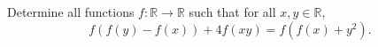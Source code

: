 Determine all functions $f\colon\mathbb{R} \rightarrow \mathbb{R}$
such that for all $x,y \in \mathbb{R}$,
\[
    f(f(y)-f(x))+4f(xy)=f(f(x)+y^2).
\]
